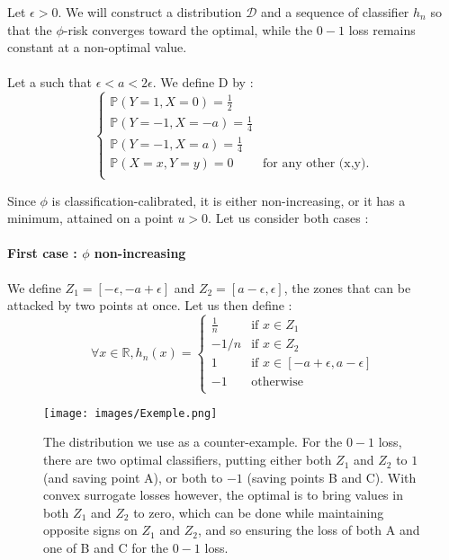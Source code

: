 \begin{prv*}

Let $\epsilon > 0$. We will construct a distribution $\mathcal{D}$ and a sequence of classifier $h_n$ so that the $\phi$-risk converges toward the optimal, while the $0-1$ loss remains constant at a non-optimal value.

\paragraph{}Let a such that $\epsilon < a < 2 \epsilon$. We define D by :
\[
\left\{ \begin{array}{ll}
\mathbb{P}(Y=1, X=0) = \frac{1}{2} & \\
\mathbb{P}(Y=-1, X=-a) = \frac{1}{4} & \\
\mathbb{P}(Y=-1, X=a) = \frac{1}{4} & \\
\mathbb{P}(X=x, Y=y) = 0 & \mbox{for any other (x,y).} \\
\end{array} \right.
\]

Since $\phi$ is classification-calibrated, it is either non-increasing, or it has a minimum, attained on a point $u>0$. Let us consider both cases :

\paragraph{First case : $\phi$ non-increasing}

We define $Z_1 = [-\epsilon, -a + \epsilon]$ and $Z_2 = [a-\epsilon, \epsilon]$, the zones that can be attacked by two points at once.
Let us then define : 
\[
\forall x \in \mathbb{R}, h_n(x) = \left\{ \begin{array}{ll}
\frac{1}{n} & \mbox{if } x \in Z_1 \\
-1/n & \mbox{if } x \in Z_2 \\
1 & \mbox{if }x \in [-a+\epsilon, a-\epsilon] \\
-1 & \mbox{otherwise} \\
\end{array} \right.
\]

\begin{figure}
    \centering
    \texttt{[image: images/Exemple.png]}
    \caption{The distribution we use as a counter-example. For the $0-1$ loss, there are two optimal classifiers, putting either both $Z_1$ and $Z_2$ to $1$ (and saving point A), or both to $-1$ (saving points B and C). With convex surrogate losses however, the optimal is to bring values in both $Z_1$ and $Z_2$ to zero, which can be done while maintaining opposite signs on $Z_1$ and $Z_2$, and so ensuring the loss of both A and one of B and C for the $0-1$ loss. }
    \label{fig:my_label}
\end{figure}



\end{prv*}
